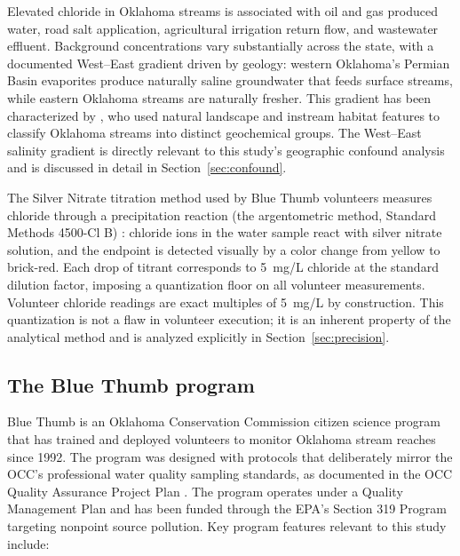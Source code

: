 \documentclass[lineno]{wlpeerj}
\begin{document}
Elevated chloride in Oklahoma streams is associated with oil and gas produced water, road salt application, agricultural irrigation return flow, and wastewater effluent. Background concentrations vary substantially across the state, with a documented West--East gradient driven by geology: western Oklahoma's Permian Basin evaporites produce naturally saline groundwater that feeds surface streams, while eastern Oklahoma streams are naturally fresher. This gradient has been characterized by \citet{Dyer2025}, who used natural landscape and instream habitat features to classify Oklahoma streams into distinct geochemical groups. The West--East salinity gradient is directly relevant to this study's geographic confound analysis and is discussed in detail in Section~\ref{sec:confound}.

The Silver Nitrate titration method used by Blue Thumb volunteers measures chloride through a precipitation reaction (the argentometric method, Standard Methods 4500-Cl B) \citep{StandardMethods2017}: chloride ions in the water sample react with silver nitrate solution, and the endpoint is detected visually by a color change from yellow to brick-red. Each drop of titrant corresponds to 5~mg/L chloride at the standard dilution factor, imposing a quantization floor on all volunteer measurements. Volunteer chloride readings are exact multiples of 5~mg/L by construction. This quantization is not a flaw in volunteer execution; it is an inherent property of the analytical method and is analyzed explicitly in Section~\ref{sec:precision}.

\subsection{The Blue Thumb program}

Blue Thumb is an Oklahoma Conservation Commission citizen science program that has trained and deployed volunteers to monitor Oklahoma stream reaches since 1992. The program was designed with protocols that deliberately mirror the OCC's professional water quality sampling standards, as documented in the OCC Quality Assurance Project Plan \citep[QAPP;][]{Bond2026}. The program operates under a Quality Management Plan and has been funded through the EPA's Section 319 Program targeting nonpoint source pollution. Key program features relevant to this study include:
\end{document}

